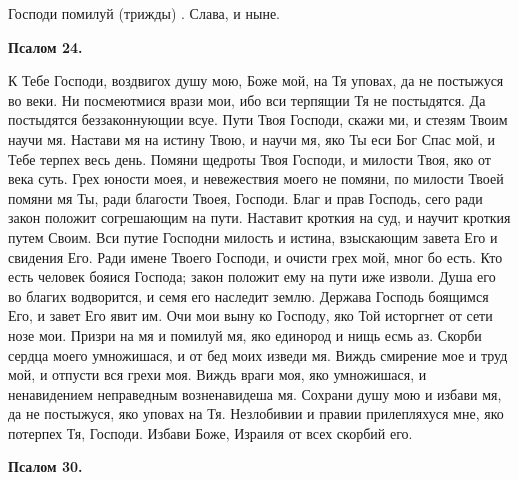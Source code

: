 Господи помилуй (трижды) . Слава, и ныне.


\medskip


\bfseries Псалом 24.\normalfont{}


К Тебе Господи, воздвигох душу мою, Боже мой, на Тя уповах, да не постыжуся во веки. Ни посмеютмися врази мои, ибо вси терпящии Тя не постыдятся. Да постыдятся беззаконнующии всуе. Пути Твоя Господи, скажи ми, и стезям Твоим научи мя. Настави мя на истину Твою, и научи мя, яко Ты еси Бог Спас мой, и Тебе терпех весь день. Помяни щедроты Твоя Господи, и милости Твоя, яко от века суть. Грех юности моея, и невежествия моего не помяни, по милости Твоей помяни мя Ты, ради благости Твоея, Господи. Благ и прав Господь, сего ради закон положит согрешающим на пути. Наставит кроткия на суд, и научит кроткия путем Своим. Вси путие Господни милость и истина, взыскающим завета Его и свидения Его. Ради имене Твоего Господи, и очисти грех мой, мног бо есть. Кто есть человек бояися Господа; закон положит ему на пути иже изволи. Душа его во благих водворится, и семя его наследит землю. Держава Господь боящимся Его, и завет Его явит им. Очи мои выну ко Господу, яко Той исторгнет от сети нозе мои. Призри на мя и помилуй мя, яко единород и нищь есмь аз. Скорби сердца моего умножишася, и от бед моих изведи мя. Виждь смирение мое и труд мой, и отпусти вся грехи моя. Виждь враги моя, яко умножишася, и ненавидением неправедным возненавидеша мя. Сохрани душу мою и избави мя, да не постыжуся, яко уповах на Тя. Незлобивии и правии прилепляхуся мне, яко потерпех Тя, Господи. Избави Боже, Израиля от всех скорбий его.


\medskip


\bfseries Псалом 30.\normalfont{}


